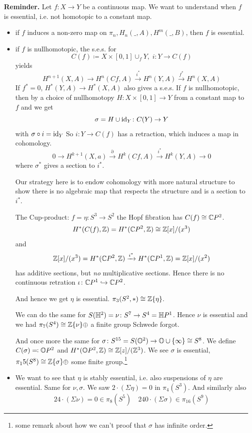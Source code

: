 \documentclass[language=english]{TemplateLecture}
\begin{document}
\textbf{Reminder.} Let \(f\colon X \to Y\) be a continuous map. We want to understand when \(f\) is essential, i.e. not homotopic to a constant map.
\begin{itemize}
    \item if \(f\) induces a non-zero map on \(\pi_n, H_n(\_, A), H^m(\_, B)\), then \(f\) is essential.
    \item if \(f\) is nullhomotopic, the s.e.s. for
    \[C(f)\coloneq X\times [0,1] \cup_f Y, \; i\colon Y \to C(f)\]
    yields
    \[H^{n+1}(X,A) \xrightarrow{ } H^n(Cf, A)\xrightarrow{i^*} H^n(Y,A)\xrightarrow{f^*} H^n(X,A)\]
    If \(f^* = 0\), \(H^*(Y,A) \to H^*(X,A)\) also gives a s.e.s. If \(f\) is nullhomotopic, then by a choice of nullhomotopy \(H\colon X\times [0,1]\to Y\) from a constant map to \(f\) and we get
    \[\sigma = H\cup \operatorname{id}_Y \colon C(Y)\to Y\]
    with \(\sigma\circ i =\operatorname{id}_Y\) So \(i\colon Y\to C(f)\) has a retraction, which induces a map in cohomology.
    \[0\to H^{k+1}(X,a)\xrightarrow{\partial} H^k(Cf, A)\xrightarrow{i^*} H^k(Y,A) \to 0\]
    where \(\sigma^*\) gives a section to \(i^*\).

    Our strategy here is to endow cohomology with more natural structure to show there is no algebraic map that respects the structure and is a section to \(i^*\).

    The Cup-product: \(f = \eta\colon S^3\to S^2\) the Hopf fibration has \(C(f) \cong \mathbb{C} P^2\).
    \[H^*(C(f),\mathbb{Z}) = H^*(\mathbb{C} P^2, \mathbb{Z})\cong \mathbb{Z}[x]/(x^3)\]
    and
    \[\mathbb{Z}[x]/(x^3) = H^*(\mathbb{C} P^2, \mathbb{Z}) \xrightarrow{i^*} H^*(\mathbb{C} P^1, \mathbb{Z}) = \mathbb{Z}[x]/(x^2)\]
    has additive sections, but \emph{no} multiplicative sections. Hence there is no continuous retration \(\iota\colon \mathbb{C} P^1 \hookrightarrow \mathbb{C} P^2\).

    And hence we get \(\eta\) is essential. \(\pi_3(S^2, *) \cong \mathbb{Z}\{\eta\}\).

    We can do the same for \(S(\mathbb{H}^2) = \nu\colon S^7 \to S^4 = \mathbb{H} P^1\). Hence \(\nu\) is essential and we had \(\pi_7(S^4) \cong \mathbb{Z}\{\nu\} \oplus \) a finite group Schwede forgot.

    And once more the same for \(\sigma\colon S^{15} = S(\mathbb{O} ^2)\to \mathbb{O} \cup \{\infty\} \cong S^8\). We define \(C(\sigma) \eqcolon \mathbb{O} P^2\) and \(H^*(\mathbb{O} P^2, \mathbb{Z})\cong \mathbb{Z}[z]/(\mathbb{Z}^3)\). We see \(\sigma\) is essential, \(\pi_15(S^8)\cong \mathbb{Z}\{\sigma\} \oplus\) some finite group.\footnote{some remark about how we can't proof that \(\sigma\) has infinite order.}

    \item We want to see that \(\eta\) is stably essential, i.e. also suspensions of \(\eta\) are essential. Same for \(\nu, \sigma\). We saw \(2\cdot (\Sigma \eta) = 0\) in \(\pi_4(S^3)\). And similarly also
    \[24 \cdot (\Sigma\nu) = 0 \in \pi_8(S^5) \quad 240 \cdot (\Sigma\sigma) \in \pi_{16}(S^9)\]
\end{itemize}
\end{document}
